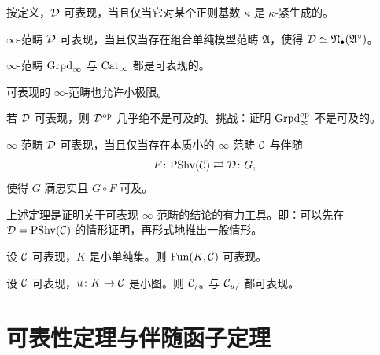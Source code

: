 \nitem\label{L13-3.7} 按定义，$\mathcal{D}$ 可表现，当且仅当它对某个正则基数 $\kappa$ 是 $\kappa$-紧生成的。

\begin{theorem}[HTT.A.3.7.6]\label{L13-3.8}
$\infty$-范畴 $\mathcal{D}$ 可表现，当且仅当存在组合单纯模型范畴 $\mathfrak{A}$，使得 $\mathcal{D}\simeq\mathfrak{N}_{\bullet}(\mathfrak{A}^{\circ})$。
\end{theorem}


\begin{corollary}\label{L13-3.9}
$\infty$-范畴 $\operatorname{Grpd}_\infty$ 与 $\operatorname{Cat}_\infty$ 都是可表现的。
\end{corollary}

\begin{theorem}[HTT.5.5.2.4]\label{L13-3.10}
可表现的 $\infty$-范畴也允许小极限。
\end{theorem}

\begin{warning}\label{L13-3.11}
若 $\mathcal{D}$ 可表现，则 $\mathcal{D}^{\mathrm{op}}$ 几乎绝不是可及的。挑战：证明 $\operatorname{Grpd}^{\mathrm{op}}_\infty$ 不是可及的。
\end{warning}

\begin{theorem}[HTT.5.5.1.1]\label{L13-3.12}
$\infty$-范畴 $\mathcal{D}$ 可表现，当且仅当存在本质小的 $\infty$-范畴 $\mathcal{C}$ 与伴随
\[
F\colon\mathrm{PShv}(\mathcal{C})\rightleftarrows\mathcal{D}\colon G,
\]
使得 $G$ 满忠实且 $G\circ F$ 可及。
\end{theorem}

\begin{remark}\label{L13-3.13}
上述定理是证明关于可表现 $\infty$-范畴的结论的有力工具。即：可以先在 $\mathcal{D}=\mathrm{PShv}(\mathcal{C})$ 的情形证明，再形式地推出一般情形。
\end{remark}

\begin{proposition}[HTT.5.5.3.6]\label{L13-3.14}
设 $\mathcal{C}$ 可表现，$K$ 是小单纯集。则 $\operatorname{Fun}(K,\mathcal{C})$ 可表现。
\end{proposition}

\begin{proposition}[HTT.5.5.3.10, 5.5.3.11]\label{L13-3.15}
设 $\mathcal{C}$ 可表现，$u\colon K\to\mathcal{C}$ 是小图。则 $\mathcal{C}_{/u}$ 与 $\mathcal{C}_{u/}$ 都可表现。
\end{proposition}

\section{可表性定理与伴随函子定理}

